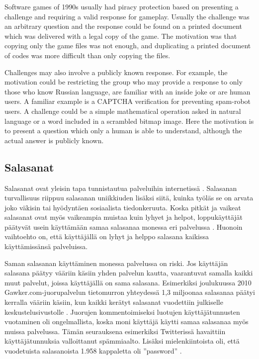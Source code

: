 \documentclass[english,gradu]{tktltiki}
\begin{document}
Software games of 1990s usually had piracy protection based on presenting a challenge and requiring a valid response for gameplay. Usually the challenge was an arbitrary question and the response could be found on a printed document which was delivered with a legal copy of the game. The motivation was that copying only the game files was not enough, and duplicating a printed document of codes was more difficult than only copying the files.

Challenges may also involve a publicly known response. For example, the motivation could be restricting the group who may provide a response to only those who know Russian language, are familiar with an inside joke or are human users. A familiar example is a CAPTCHA verification for preventing spam-robot users. A challenge could be a simple mathematical operation asked in natural language or a word included in a scrambled bitmap image. Here the motivation is to present a question which only a human is able to understand, although the actual answer is publicly known.


\subsection{Salasanat}
 \label{sec:passwords}

Salasanat ovat yleisin tapa tunnistautua palveluihin internetissä \cite{study_of_passwords_07, passpet_06, password_management_strategies_06, pwdhash_extension_05}.
Salasanan turvallisuus riippuu salasanan uniikkiuden lisäksi siitä, kuinka työläs se on arvata joko väkisin tai hyödyntäen sosiaalista tiedonkeruuta. Koska pitkät ja vaikeat salasanat ovat myös vaikeampia muistaa kuin lyhyet ja helpot, loppukäyttäjät päätyvät usein käyttämään samaa salasanaa monessa eri palvelussa \cite{study_of_passwords_07}. Huonoin vaihtoehto on, että käyttäjällä on lyhyt ja helppo salasana kaikissa käyttämissänsä palveluissa.

Saman salasanan käyttäminen monessa palvelussa on riski. Jos käyttäjän salasana päätyy vääriin käsiin yhden palvelun kautta, vaarantuvat samalla kaikki muut palvelut, joissa käyttäjällä on sama salasana. Esimerkiksi joulukuussa 2010 Gawker.com-juorupalvelun tietomurron yhteydessä 1,3 miljoonaa salasanaa päätyi kerralla vääriin käsiin, kun kaikki kerätyt salasanat vuodettiin julkiselle keskustelusivustolle \cite{bbc_gawker_12_2010, forbes_gawker_12_2010}. Juorujen kommentoimiseksi luotujen käyttäjätunnusten vuotaminen oli ongelmallista, koska moni käyttäjä käytti samaa salasanaa myös muissa palvelussa. Tämän seurauksena esimerkiksi Twitterissä havaittiin käyttäjätunnuksia valloittanut spämmiaalto. Lisäksi mielenkiintoista oli, että vuodetuista salasanoista 1.958 kappaletta oli ''password'' \cite{forbes_gawker_12_2010}.
\end{document}
